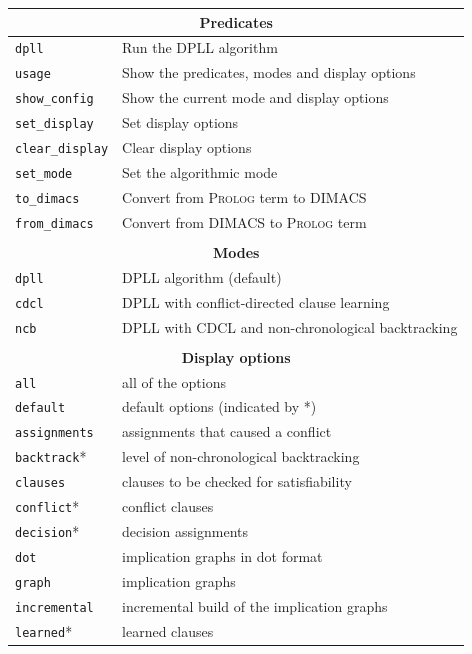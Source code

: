 \documentclass[11pt]{article}
\newcommand*{\p}[1]{\textup{\texttt{#1}}}
\newcommand*{\pl}{\textsc{Prolog}}
\begin{document}
\begin{center}
\begin{tabular}{|l|l|}
\hline
\multicolumn{2}{|c|}{\textbf{\large Predicates}}\\
\hline
\p{dpll}&Run the DPLL algorithm\\
\p{usage}&Show the predicates, modes and display options \\
\p{show\_config}&Show the current mode and display options\\
\p{set\_display}&Set display options\\
\p{clear\_display}&Clear display options\\
\p{set\_mode}&Set the algorithmic mode\\
\p{to\_dimacs}&Convert from \pl{} term to DIMACS\\
\p{from\_dimacs}&Convert from DIMACS to \pl{} term\\
\hline
\multicolumn{2}{c}{}\\
\hline
\multicolumn{2}{|c|}{\textbf{\large Modes}}\\
\hline
\p{dpll} & DPLL algorithm (default)\\
\p{cdcl} & DPLL with conflict-directed clause learning\\
\p{ncb} &  DPLL with CDCL and non-chronological backtracking\\
\hline
\multicolumn{2}{c}{}\\
\hline
\multicolumn{2}{|c|}{\textbf{\large Display options}}\\
\hline
\p{all}       &  all of the options\\
\p{default}   &  default options (indicated by *)\\
\hline
\p{assignments}& assignments that caused a conflict         \\
\p{backtrack}*&  level of non-chronological backtracking    \\
\p{clauses}   &  clauses to be checked for satisfiability   \\
\p{conflict}* &  conflict clauses                           \\
\p{decision}* &  decision assignments                       \\
\p{dot}       &  implication graphs in dot format           \\
\p{graph}     &  implication graphs                         \\
\p{incremental}& incremental build of the implication graphs\\
\p{learned}*  &  learned clauses                             \\

\end{tabular}
\end{center}
\end{document}
